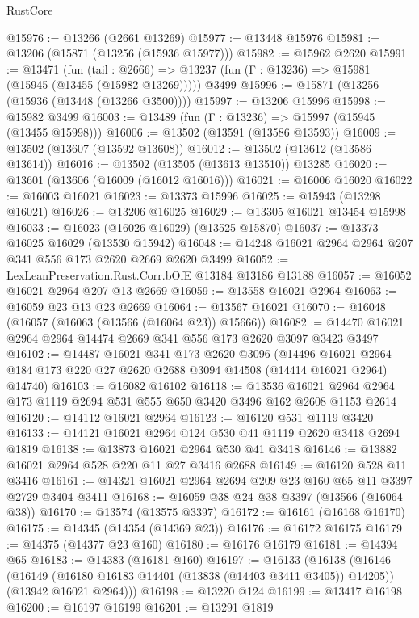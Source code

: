 \begin{lexlean}{RustCore}
\begin{coremodule}
@15976 := @13266 (@2661 @13269)
@15977 := @13448 @15976
@15981 := @13206 (@15871 (@13256 (@15936 @15977)))
@15982 := @15962 @2620
@15991 := @13471
    (fun (tail : @2666) => @13237 (fun (Γ : @13236) => @15981 (@15945 (@13455 (@15982 @13269)))))
    @3499
@15996 := @15871 (@13256 (@15936 (@13448 (@13266 @3500))))
@15997 := @13206 @15996
@15998 := @15982 @3499
@16003 := @13489 (fun (Γ : @13236) => @15997 (@15945 (@13455 @15998)))
@16006 := @13502 (@13591 (@13586 @13593))
@16009 := @13502 (@13607 (@13592 @13608))
@16012 := @13502 (@13612 (@13586 @13614))
@16016 := @13502 (@13505 (@13613 @13510)) @13285
@16020 := @13601 (@13606 (@16009 (@16012 @16016)))
@16021 := @16006 @16020
@16022 := @16003 @16021
@16023 := @13373 @15996
@16025 := @15943 (@13298 @16021)
@16026 := @13206 @16025
@16029 := @13305 @16021 @13454 @15998
@16033 := @16023 (@16026 @16029) (@13525 @15870)
@16037 := @13373 @16025 @16029 (@13530 @15942)
@16048 := @14248 @16021 @2964 @2964 @207 @341 @556 @173 @2620 @2669 @2620 @3499
@16052 := LexLeanPreservation.Rust.Corr.bOfE @13184 @13186 @13188
@16057 := @16052 @16021 @2964 @207 @13 @2669
@16059 := @13558 @16021 @2964
@16063 := @16059 @23 @13 @23 @2669
@16064 := @13567 @16021
@16070 := @16048 (@16057 (@16063 (@13566 (@16064 @23)) @15666))
@16082 := @14470 @16021 @2964 @2964 @14474 @2669 @341 @556 @173 @2620 @3097 @3423 @3497
@16102 := @14487
    @16021
    @341
    @173
    @2620
    @3096
    (@14496 @16021 @2964 @184 @173 @220 @27 @2620 @2688 @3094 @14508 (@14414 @16021 @2964) @14740)
@16103 := @16082 @16102
@16118 := @13536
    @16021
    @2964
    @2964
    @173
    @1119
    @2694
    @531
    @555
    @650
    @3420
    @3496
    @162
    @2608
    @1153
    @2614
@16120 := @14112 @16021 @2964
@16123 := @16120 @531 @1119 @3420
@16133 := @14121 @16021 @2964 @124 @530 @41 @1119 @2620 @3418 @2694 @1819
@16138 := @13873 @16021 @2964 @530 @41 @3418
@16146 := @13882 @16021 @2964 @528 @220 @11 @27 @3416 @2688
@16149 := @16120 @528 @11 @3416
@16161 := @14321 @16021 @2964 @2694 @209 @23 @160 @65 @11 @3397 @2729 @3404 @3411
@16168 := @16059 @38 @24 @38 @3397 (@13566 (@16064 @38))
@16170 := @13574 (@13575 @3397)
@16172 := @16161 (@16168 @16170)
@16175 := @14345 (@14354 (@14369 @23))
@16176 := @16172 @16175
@16179 := @14375 (@14377 @23 @160)
@16180 := @16176 @16179
@16181 := @14394 @65
@16183 := @14383 (@16181 @160)
@16197 := @16133
    (@16138
      (@16146
        (@16149 (@16180 @16183 @14401 (@13838 (@14403 @3411 @3405)) @14205))
        (@13942 @16021 @2964)))
@16198 := @13220 @124
@16199 := @13417 @16198
@16200 := @16197 @16199
@16201 := @13291 @1819

\end{coremodule}
\end{lexlean}
